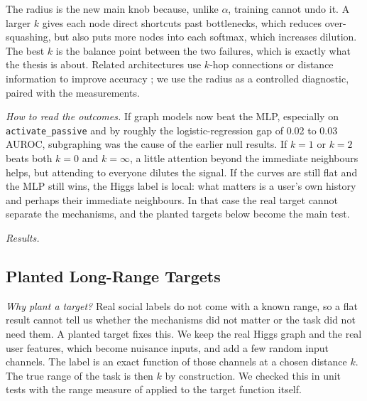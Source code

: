 The radius is the new main knob because, unlike $\alpha$, training cannot undo it. A larger $k$ gives each node direct shortcuts past bottlenecks, which reduces over-squashing, but also puts more nodes into each softmax, which increases dilution. The best $k$ is the balance point between the two failures, which is exactly what the thesis is about. Related architectures use $k$-hop connections or distance information to improve accuracy \citep{f_gutteridge2023,f_abboud2022,ying2021}; we use the radius as a controlled diagnostic, paired with the measurements.

\emph{How to read the outcomes.} If graph models now beat the MLP, especially on \texttt{activate\_\allowbreak passive} and by roughly the logistic-regression gap of 0.02 to 0.03 AUROC, subgraphing was the cause of the earlier null results. If $k=1$ or $k=2$ beats both $k=0$ and $k=\infty$, a little attention beyond the immediate neighbours helps, but attending to everyone dilutes the signal. If the curves are still flat and the MLP still wins, the Higgs label is local: what matters is a user's own history and perhaps their immediate neighbours. In that case the real target cannot separate the mechanisms, and the planted targets below become the main test.

\emph{Results.}  

\subsection{Planted Long-Range Targets}
\emph{Why plant a target?} Real social labels do not come with a known range, so a flat result cannot tell us whether the mechanisms did not matter or the task did not need them. A planted target fixes this. We keep the real Higgs graph and the real user features, which become nuisance inputs, and add a few random input channels. The label is an exact function of those channels at a chosen distance $k$. The true range of the task is then $k$ by construction. We checked this in unit tests with the range measure of \citet{bamberger2025} applied to the target function itself.

